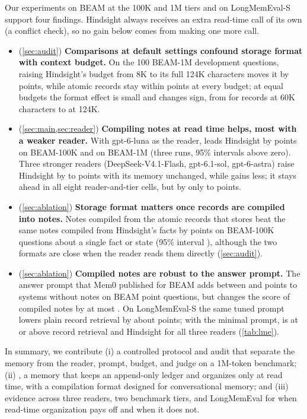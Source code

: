 Our experiments on BEAM at the 100K and 1M tiers and on LongMemEval-S support four findings. Hindsight
always receives an extra read-time call of its own (a conflict check), so no gain below comes from \method{} making
one more call.
\begin{itemize}
\item (\cref{sec:audit}) \textbf{Comparisons at default settings confound storage format with context budget.} On the
100 BEAM-1M development questions, raising Hindsight's budget from 8K to its full 124K characters moves it by
 points, while atomic records stay within  points at every budget; at equal budgets the format
effect is small and changes sign, from  for records at 60K characters to  at 124K.
\item (\cref{sec:main,sec:reader}) \textbf{Compiling notes at read time helps, most with a weaker reader.} With
gpt-6-luna as the reader, \method{} leads Hindsight by  points on BEAM-100K and 
on BEAM-1M (three runs, 95\% intervals above zero). Three stronger readers (DeepSeek-V4.1-Flash, gpt-6.1-sol,
gpt-6-astra) raise Hindsight by  to  points with its memory unchanged, while \method{} gains less;
it stays ahead in all eight reader-and-tier cells, but by only  to  points.
\item (\cref{sec:ablation}) \textbf{Storage format matters once records are compiled into notes.} Notes compiled from
the atomic records that \method{} stores beat the same notes compiled from Hindsight's facts by  points on BEAM-100K questions about a single fact or state (95\% interval \prelim{$[+2.6, +11.0]$}), although the
two formats are close when the reader reads them directly (\cref{sec:audit}).
\item (\cref{sec:ablation}) \textbf{Compiled notes are robust to the answer prompt.} The answer prompt that Mem0
published for BEAM adds between  and  points to systems without notes on BEAM point questions,
but changes the score of compiled notes by at most . On LongMemEval-S the same tuned prompt lowers plain
record retrieval by about  points; with the minimal prompt, \method{} is at or above record retrieval and
Hindsight for all three readers (\cref{tab:lme}).
\end{itemize}

In summary, we contribute (i) a controlled protocol and audit that separate the memory from the reader, prompt,
budget, and judge on a 1M-token benchmark; (ii) \method{}, a memory that keeps an append-only ledger and organizes
only at read time, with a compilation format designed for conversational memory; and (iii) evidence across three
readers, two benchmark tiers, and LongMemEval for when read-time organization pays off and when it does not.
